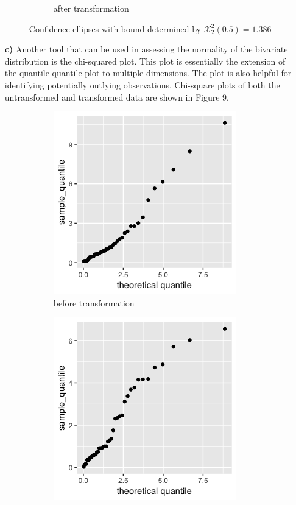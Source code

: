\begin{enumerate}
\begin{figure}[H]
\begin{subfigure}{.5\textwidth}
  \caption{after transformation}
  \label{fig:sfig2}
\end{subfigure}
\caption{Confidence ellipses with bound determined by $\mathcal{X}_2^2(0.5)=1.386$}
\end{figure}

	\item[\bf{c)}] Another tool that can be used in assessing the normality of the bivariate distribution is the chi-squared plot. This plot is essentially the extension of the quantile-quantile plot to multiple dimensions. The plot is also helpful for identifying potentially outlying observations. Chi-square plots of both the untransformed and transformed data are shown in Figure 9.
\begin{figure}[H]
\begin{subfigure}{.5\textwidth}
  \centering
	\includegraphics[width=.8\linewidth]{plot_4_29_c.png}
  \caption{before transformation}
  \label{fig:sfig1}
\end{subfigure}%
\begin{subfigure}{.5\textwidth}
  \centering
	\includegraphics[width=.8\linewidth]{plot_4_29_cnew.png}

\end{subfigure}
\end{figure}
\end{enumerate}
